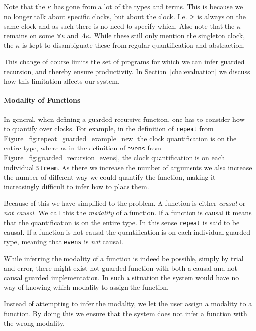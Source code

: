 Note that the $\kappa$ has gone from a lot of the types and terms. This is
because we no longer talk about specific clocks, but about the
clock. I.e. $\rhd$ is always on the same clock and as such there is no need to
specify which. Also note that the $\kappa$ remains on some $\forall \kappa$ and
$\Lambda \kappa$. While these still only mention the singleton clock, the
$\kappa$ is kept to disambiguate these from regular quantification and
abstraction. 

This change of course limits the set of programs for which we can infer guarded
recursion, and thereby ensure productivity. In Section~\ref{cha:evaluation} we
discuss how this limitation affects our system.

\paragraph{Modality of Functions}
In general, when defining a guarded recursive function, one has to consider how
to quantify over clocks. For example, in the definition of \texttt{repeat} from
Figure~\ref{fig:repeat_guarded_example_new} the clock quantification is on the
entire type, where as in the definition of \texttt{evens} from
Figure~\ref{fig:guarded_recursion_evens}, the clock quantification is on each
individual \texttt{Stream}. As there we increase the number of arguments we also
increase the number of different way we could quantify the function, making it
increasingly difficult to infer how to place them.

Because of this we have simplified to the problem. A function is either
\emph{causal} or \emph{not causal}. We call this the \emph{modality} of a
function. If a function is causal it means that the quantification is on the
entire type. In this sense \texttt{repeat} is said to be causal. If a function
is not causal the quantification is on each individual guarded type, meaning
that \texttt{evens} is \emph{not} causal.

While inferring the modality of a function is indeed be possible, simply by
trial and error, there might exist not guarded function with both a causal and
not causal guarded implementation. In such a situation the system would have no
way of knowing which modality to assign the function.

Instead of attempting to infer the modality, we let the user assign a modality
to a function. By doing this we ensure that the system does not infer a function
with the wrong modality.

